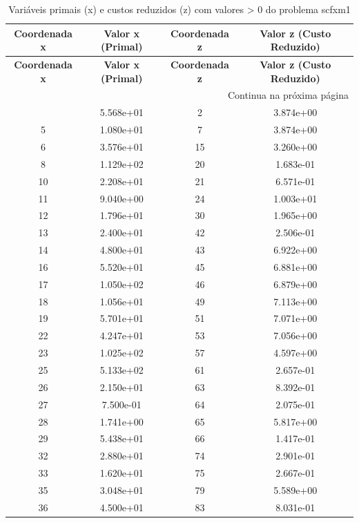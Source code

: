 \documentclass[12pt]{article}
\begin{document}
\begin{longtable}{@{}cccc@{}}
\caption{Variáveis primais (x) e custos reduzidos (z) com valores > 0 do problema scfxm1} \\
\toprule
\textbf{Coordenada x} & \textbf{Valor x (Primal)} & \textbf{Coordenada z} & \textbf{Valor z (Custo Reduzido)} \\
\midrule
\endfirsthead

\toprule
\textbf{Coordenada x} & \textbf{Valor x (Primal)} & \textbf{Coordenada z} & \textbf{Valor z (Custo Reduzido)} \\
\midrule
\endhead

\midrule \multicolumn{4}{r}{{Continua na próxima página}} \\ \midrule
\endfoot

\bottomrule
\endlastfoot
3 & 5.568e+01 & 2 & 3.874e+00 \\
5 & 1.080e+01 & 7 & 3.874e+00 \\
6 & 3.576e+01 & 15 & 3.260e+00 \\
8 & 1.129e+02 & 20 & 1.683e-01 \\
10 & 2.208e+01 & 21 & 6.571e-01 \\
11 & 9.040e+00 & 24 & 1.003e+01 \\
12 & 1.796e+01 & 30 & 1.965e+00 \\
13 & 2.400e+01 & 42 & 2.506e-01 \\
14 & 4.800e+01 & 43 & 6.922e+00 \\
16 & 5.520e+01 & 45 & 6.881e+00 \\
17 & 1.050e+02 & 46 & 6.879e+00 \\
18 & 1.056e+01 & 49 & 7.113e+00 \\
19 & 5.701e+01 & 51 & 7.071e+00 \\
22 & 4.247e+01 & 53 & 7.056e+00 \\
23 & 1.025e+02 & 57 & 4.597e+00 \\
25 & 5.133e+02 & 61 & 2.657e-01 \\
26 & 2.150e+01 & 63 & 8.392e-01 \\
27 & 7.500e-01 & 64 & 2.075e-01 \\
28 & 1.741e+00 & 65 & 5.817e+00 \\
29 & 5.438e+01 & 66 & 1.417e-01 \\
32 & 2.880e+01 & 74 & 2.901e-01 \\
33 & 1.620e+01 & 75 & 2.667e-01 \\
35 & 3.048e+01 & 79 & 5.589e+00 \\
36 & 4.500e+01 & 83 & 8.031e-01 \\

\end{longtable}
\end{document}

